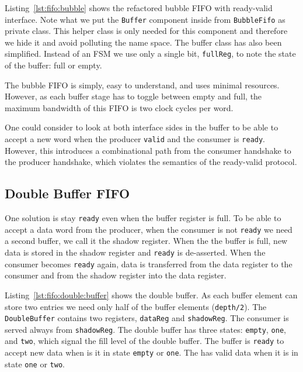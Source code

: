 \documentclass[%
    10pt,
    headinclude, footexclude,
    openright, %
    notitlepage,
    cleardoubleempty,
    headsepline,
    pointlessnumbers,
    bibtotoc, idxtotoc,
    ]{scrbook}
\newcommand{\code}[1]{{\small{\texttt{#1}}}}
\begin{document}

Listing~\ref{lst:fifo:bubble} shows the refactored bubble FIFO with ready-valid
interface. Note what we put the \code{Buffer} component inside from \code{BubbleFifo}
as private class. This helper class is only needed for this component and therefore
we hide it and avoid polluting the name space. The buffer class has also been
simplified. Instead of an FSM we use only a single bit, \code{fullReg}, to note
the state of the buffer: full or empty.

The bubble FIFO is simply, easy to understand, and uses minimal resources.
However, as each buffer stage has to toggle between empty and full, the maximum
bandwidth of this FIFO is two clock cycles per word.

One could consider to look at both interface sides in the buffer to be able to accept
a new word when the producer \code{valid} and the consumer is \code{ready}.
However, this introduces a combinational path from the consumer handshake
to the producer handshake, which violates the semantics of the ready-valid protocol.

\subsection{Double Buffer FIFO}


One solution is stay \code{ready} even when the buffer register is full.
To be able to accept a data word from the producer, when the consumer is not
\code{ready} we need a second buffer, we call it the shadow register.
When the the buffer is full, new data is stored in the shadow register and \code{ready}
is de-asserted. When the consumer becomes \code{ready} again, data is transferred
from the data register to the consumer and from the shadow register into
the data register.



Listing~\ref{lst:fifo:double:buffer} shows the double buffer. As each buffer element
can store two entries we need only half of the buffer elements (\code{depth/2}).
The \code{DoubleBuffer} contains two registers,
\code{dataReg} and \code{shadowReg}. The consumer is served always from
\code{shadowReg}. The double buffer has three states: \code{empty}, \code{one},
and \code{two}, which signal the fill level of the double buffer.
The buffer is \code{ready} to accept new data when is it in state \code{empty}
or \code{one}. The has valid data when it is in state \code{one} or \code{two}.
\end{document}
